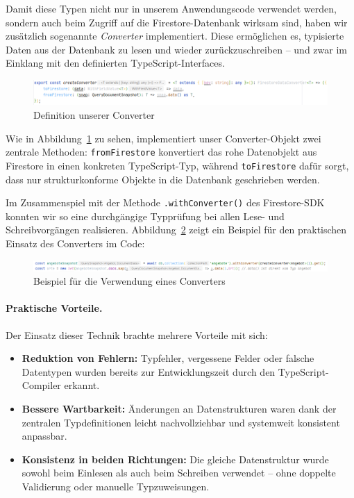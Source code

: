 \documentclass[12pt,a4paper%
              ,oneside     %
              ,titlepage
              ,DIV=13
              ,headinclude
              ,footinclude=false%
              ,cleardoublepage=empty%
              ,parskip=half,
              BCOR=0mm,
              ]{scrreprt}
\begin{document}
Damit diese Typen nicht nur in unserem Anwendungscode verwendet werden, sondern auch beim Zugriff auf die Firestore-Datenbank wirksam sind, haben wir zusätzlich sogenannte \textit{Converter} implementiert. Diese ermöglichen es, typisierte Daten aus der Datenbank zu lesen und wieder zurückzuschreiben – und zwar im Einklang mit den definierten TypeScript-Interfaces.

\begin{figure}[H]
	\centering
	\includegraphics[width=\linewidth]{img/converter.png}
	\caption{Definition unserer Converter}
	\label{fig:converter}
\end{figure}

Wie in Abbildung~\ref{fig:converter} zu sehen, implementiert unser Converter-Objekt zwei zentrale Methoden: \texttt{fromFirestore} konvertiert das rohe Datenobjekt aus Firestore in einen konkreten TypeScript-Typ, während \texttt{toFirestore} dafür sorgt, dass nur strukturkonforme Objekte in die Datenbank geschrieben werden. 

Im Zusammenspiel mit der Methode \texttt{.withConverter()} des Firestore-SDK konnten wir so eine durchgängige Typprüfung bei allen Lese- und Schreibvorgängen realisieren. Abbildung~\ref{fig:converter_example} zeigt ein Beispiel für den praktischen Einsatz des Converters im Code:

\begin{figure}[H]
	\centering
	\includegraphics[width=\linewidth]{img/converter_example.png}
	\caption{Beispiel für die Verwendung eines Converters}
	\label{fig:converter_example}
\end{figure}

\paragraph{\textbf{Praktische Vorteile.}} Der Einsatz dieser Technik brachte mehrere Vorteile mit sich:

\begin{itemize}
	\item \textbf{Reduktion von Fehlern:} Typfehler, vergessene Felder oder falsche Datentypen wurden bereits zur Entwicklungszeit durch den TypeScript-Compiler erkannt.
	\item \textbf{Bessere Wartbarkeit:} Änderungen an Datenstrukturen waren dank der zentralen Typdefinitionen leicht nachvollziehbar und systemweit konsistent anpassbar.
	\item \textbf{Konsistenz in beiden Richtungen:} Die gleiche Datenstruktur wurde sowohl beim Einlesen als auch beim Schreiben verwendet – ohne doppelte Validierung oder manuelle Typzuweisungen.
\end{itemize}
\end{document}
